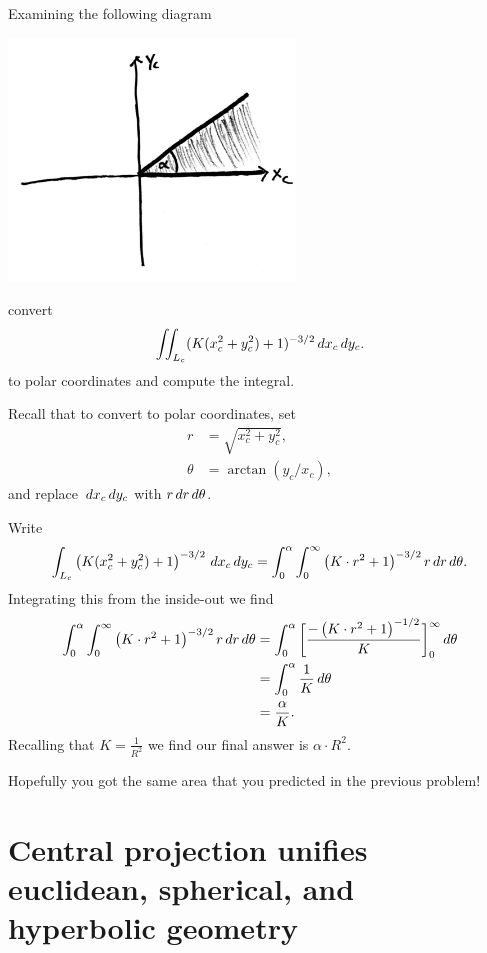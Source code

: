 \documentclass[newpage,hints,handout]{ximera}
\begin{document}
\begin{problem}
  Examining the following diagram
  \begin{image}
    \includegraphics[width=3in]{halfLune.png}
  \end{image}
  convert
  \[
  \iint_{L_c} (K(x_c^2+y_c^2)+1)^{-3/2} \,d x_c\,d y_c.
  \]
  to polar coordinates and compute the integral.
  \begin{hint}
    Recall that to convert to polar coordinates, set
    \begin{align*}
      r &= \sqrt{x_c^2+y_c^2},\\
      \theta &= \arctan(y_c/x_c),
    \end{align*}
    and replace $\,d x_c\,d y_c$ with $r\,d r\,d \theta$.
  \end{hint}
  \begin{freeResponse}
    Write
    \[
    \int_{L_c}
    \left(K(x_c^2+y_c^2)+1\right)^{-3/2} \,d x_c\,d
    y_c = \int_0^\alpha \int_0^\infty \left(K\cdot r^2+1\right)^{-3/2} r\,d r \,d \theta.
    \]
    Integrating this from the inside-out we find
    \begin{align*}
      \int_0^\alpha \int_0^\infty \left(K\cdot r^2+1\right)^{-3/2} r\,d r \,d \theta
      &= \int_0^\alpha \bigg[ \frac{-\left(K\cdot r^2+1\right)^{-1/2}}{K} \bigg]_0^\infty \,d \theta\\
      &= \int_0^\alpha \frac{1}{K} \,d \theta\\
      &= \frac{\alpha}{K}.   
    \end{align*}
    Recalling that $K = \frac{1}{R^2}$ we find our final answer is $\alpha \cdot R^2$.
  \end{freeResponse}
\end{problem}

Hopefully you got the same area that you predicted in the previous problem!

\section{Central projection unifies euclidean, spherical, and hyperbolic geometry}
\end{document}
